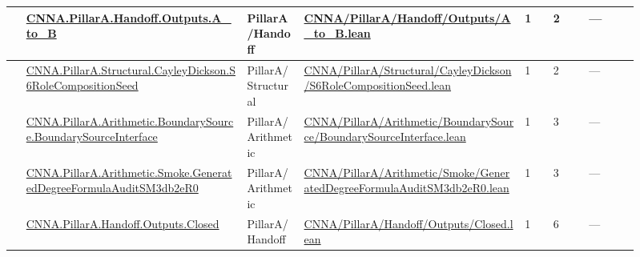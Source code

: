 \begin{longtable}{L{0.025\linewidth} L{0.315\linewidth} L{0.08\linewidth} L{0.315\linewidth} L{0.045\linewidth} L{0.055\linewidth} L{0.07\linewidth}}
\hline
{} & \href{run:repo_snapshot/CNNA/PillarA/Handoff/Outputs/A_to_B.lean}{CNNA.\allowbreak{}PillarA.\allowbreak{}Handoff.\allowbreak{}Outputs.\allowbreak{}A\_to\_B} & PillarA/\allowbreak{}Handoff & \href{run:repo_snapshot/CNNA/PillarA/Handoff/Outputs/A_to_B.lean}{CNNA/\allowbreak{}PillarA/\allowbreak{}Handoff/\allowbreak{}Outputs/\allowbreak{}A\_to\_B.\allowbreak{}lean} & 1 & 2 & ---\\
\hline
{} & \href{run:repo_snapshot/CNNA/PillarA/Structural/CayleyDickson/S6RoleCompositionSeed.lean}{CNNA.\allowbreak{}PillarA.\allowbreak{}Structural.\allowbreak{}CayleyDickson.\allowbreak{}S6RoleCompositionSeed} & PillarA/\allowbreak{}Structural & \href{run:repo_snapshot/CNNA/PillarA/Structural/CayleyDickson/S6RoleCompositionSeed.lean}{CNNA/\allowbreak{}PillarA/\allowbreak{}Structural/\allowbreak{}CayleyDickson/\allowbreak{}S6RoleCompositionSeed.\allowbreak{}lean} & 1 & 2 & ---\\
\hline
{} & \href{run:repo_snapshot/CNNA/PillarA/Arithmetic/BoundarySource/BoundarySourceInterface.lean}{CNNA.\allowbreak{}PillarA.\allowbreak{}Arithmetic.\allowbreak{}BoundarySource.\allowbreak{}BoundarySourceInterface} & PillarA/\allowbreak{}Arithmetic & \href{run:repo_snapshot/CNNA/PillarA/Arithmetic/BoundarySource/BoundarySourceInterface.lean}{CNNA/\allowbreak{}PillarA/\allowbreak{}Arithmetic/\allowbreak{}BoundarySource/\allowbreak{}BoundarySourceInterface.\allowbreak{}lean} & 1 & 3 & ---\\
\hline
{} & \href{run:repo_snapshot/CNNA/PillarA/Arithmetic/Smoke/GeneratedDegreeFormulaAuditSM3db2eR0.lean}{CNNA.\allowbreak{}PillarA.\allowbreak{}Arithmetic.\allowbreak{}Smoke.\allowbreak{}GeneratedDegreeFormulaAuditSM3db2eR0} & PillarA/\allowbreak{}Arithmetic & \href{run:repo_snapshot/CNNA/PillarA/Arithmetic/Smoke/GeneratedDegreeFormulaAuditSM3db2eR0.lean}{CNNA/\allowbreak{}PillarA/\allowbreak{}Arithmetic/\allowbreak{}Smoke/\allowbreak{}GeneratedDegreeFormulaAuditSM3db2eR0.\allowbreak{}lean} & 1 & 3 & ---\\
\hline
{} & \href{run:repo_snapshot/CNNA/PillarA/Handoff/Outputs/Closed.lean}{CNNA.\allowbreak{}PillarA.\allowbreak{}Handoff.\allowbreak{}Outputs.\allowbreak{}Closed} & PillarA/\allowbreak{}Handoff & \href{run:repo_snapshot/CNNA/PillarA/Handoff/Outputs/Closed.lean}{CNNA/\allowbreak{}PillarA/\allowbreak{}Handoff/\allowbreak{}Outputs/\allowbreak{}Closed.\allowbreak{}lean} & 1 & 6 & ---\\

\end{longtable}
